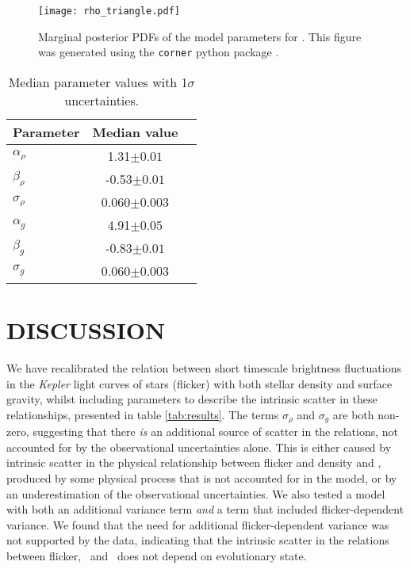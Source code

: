 \begin{figure}
\begin{center}
\texttt{[image: rho\_triangle.pdf]}
\caption{Marginal posterior PDFs of the model parameters for \rhostar.
This figure was generated using the {\tt corner} python package
\citep{corner}.}
\label{fig:triangle}
\end{center}
\end{figure}

\begin{table}
\begin{center}
\caption{Median parameter values with 1$\sigma$ uncertainties.}
\begin{tabular}{lcc}
\hline\hline
Parameter & Median value \\
    \hline
$\alpha_\rho$   &    1.31$\pm 0.01$   \\
$\beta_\rho$    &    -0.53$\pm 0.01$   \\
$\sigma_\rho$   &    0.060$\pm 0.003$   \\
\hline
$\alpha_g$      &    4.91$\pm 0.05$   \\
$\beta_g$       &   -0.83$\pm 0.01$   \\
$\sigma_g$      &    0.060$\pm 0.003$   \\
    \hline
\end{tabular}
\end{center}
\end{table}
\label{tab:results}

\section{DISCUSSION}
\label{sec:discussion}


We have recalibrated the relation between short timescale brightness
fluctuations in the {\it Kepler} light curves of stars (flicker) with both
stellar density and surface gravity, whilst including parameters to describe
the intrinsic scatter in these relationships, presented in table
\ref{tab:results}.
The terms $\sigma_\rho$ and $ \sigma_g$ are both non-zero, suggesting that
there {\it is} an additional source of scatter in the relations, not accounted
for by the observational uncertainties alone.
This is either caused by intrinsic scatter in the physical relationship
between flicker and density and \logg, produced by some physical process that
is not accounted for in the model, or by an underestimation of the
observational uncertainties.
We also tested a model with both an additional variance term {\it and} a term
that included flicker-dependent variance.
We found that the need for additional flicker-dependent variance was not
supported by the data, indicating that the intrinsic scatter in the relations
between flicker, \logg\ and \rhostar\ does not depend on evolutionary state.

